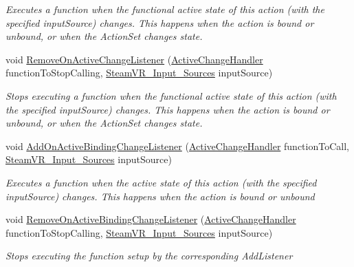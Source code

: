 \begin{DoxyCompactItemize}
\begin{DoxyCompactList}\small\item\em Executes a function when the {\itshape functional} active state of this action (with the specified input\+Source) changes. This happens when the action is bound or unbound, or when the Action\+Set changes state. \end{DoxyCompactList}\item 
void \mbox{\hyperlink{class_valve_1_1_v_r_1_1_steam_v_r___action___vector3_a594c49794c1103f0bb8c2db3c305e577}{Remove\+On\+Active\+Change\+Listener}} (\mbox{\hyperlink{class_valve_1_1_v_r_1_1_steam_v_r___action___vector3_a47d6c1c558fb45841cd626df9ab3dcb9}{Active\+Change\+Handler}} function\+To\+Stop\+Calling, \mbox{\hyperlink{namespace_valve_1_1_v_r_a82e5bf501cc3aa155444ee3f0662853f}{Steam\+V\+R\+\_\+\+Input\+\_\+\+Sources}} input\+Source)
\begin{DoxyCompactList}\small\item\em Stops executing a function when the {\itshape functional} active state of this action (with the specified input\+Source) changes. This happens when the action is bound or unbound, or when the Action\+Set changes state. \end{DoxyCompactList}\item 
void \mbox{\hyperlink{class_valve_1_1_v_r_1_1_steam_v_r___action___vector3_ab615db1dda35e5faadf620c2ecf57c4c}{Add\+On\+Active\+Binding\+Change\+Listener}} (\mbox{\hyperlink{class_valve_1_1_v_r_1_1_steam_v_r___action___vector3_a47d6c1c558fb45841cd626df9ab3dcb9}{Active\+Change\+Handler}} function\+To\+Call, \mbox{\hyperlink{namespace_valve_1_1_v_r_a82e5bf501cc3aa155444ee3f0662853f}{Steam\+V\+R\+\_\+\+Input\+\_\+\+Sources}} input\+Source)
\begin{DoxyCompactList}\small\item\em Executes a function when the active state of this action (with the specified input\+Source) changes. This happens when the action is bound or unbound \end{DoxyCompactList}\item 
void \mbox{\hyperlink{class_valve_1_1_v_r_1_1_steam_v_r___action___vector3_a6df7d004d3dd3667283d6835b5aa6b15}{Remove\+On\+Active\+Binding\+Change\+Listener}} (\mbox{\hyperlink{class_valve_1_1_v_r_1_1_steam_v_r___action___vector3_a47d6c1c558fb45841cd626df9ab3dcb9}{Active\+Change\+Handler}} function\+To\+Stop\+Calling, \mbox{\hyperlink{namespace_valve_1_1_v_r_a82e5bf501cc3aa155444ee3f0662853f}{Steam\+V\+R\+\_\+\+Input\+\_\+\+Sources}} input\+Source)
\begin{DoxyCompactList}\small\item\em Stops executing the function setup by the corresponding Add\+Listener \end{DoxyCompactList}\item 

\end{DoxyCompactItemize}
